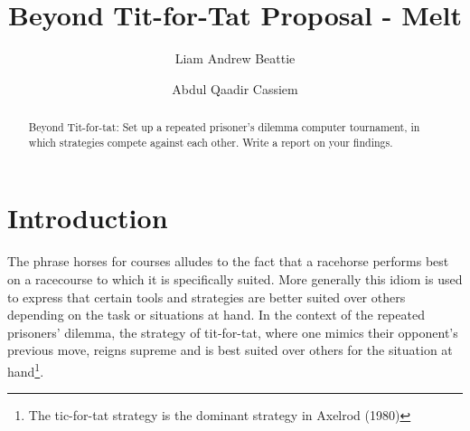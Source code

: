 \documentclass[11pt,preprint]{elsarticle}
\numberwithin{equation}{section}
\numberwithin{figure}{section}
\numberwithin{table}{section}
\let\rmarkdownfootnote\footnote%
\def\footnote{\protect\rmarkdownfootnote}
\begin{document}
\begin{frontmatter}  %

\title{Beyond Tit-for-Tat Proposal - Melt}





\author[Add1]{Liam Andrew Beattie}

\author[Add1]{Abdul Qaadir Cassiem}




\address[Add1]{Microeconomics 871, Stellenbosch University, South
Africa}


\begin{abstract}
\small{
Beyond Tit-for-tat: Set up a repeated prisoner's dilemma computer
tournament, in which strategies compete against each other. Write a
report on your findings.
}
\end{abstract}

\vspace{1cm}





\vspace{0.5cm}

\end{frontmatter}

\setcounter{footnote}{0}



\pagestyle{fancy}
\chead{}
\rhead{}
\lfoot{}
\lhead{}
\cfoot{}


\headsep 35pt %




\section{\texorpdfstring{Introduction
\label{Introduction}}{Introduction }}\label{introduction}

The phrase horses for courses alludes to the fact that a racehorse
performs best on a racecourse to which it is specifically suited. More
generally this idiom is used to express that certain tools and
strategies are better suited over others depending on the task or
situations at hand. In the context of the repeated prisoners' dilemma,
the strategy of tit-for-tat, where one mimics their opponent's previous
move, reigns supreme and is best suited over others for the situation at
hand\footnote{The tic-for-tat strategy is the dominant strategy in
  Axelrod (1980)}.
\end{document}
